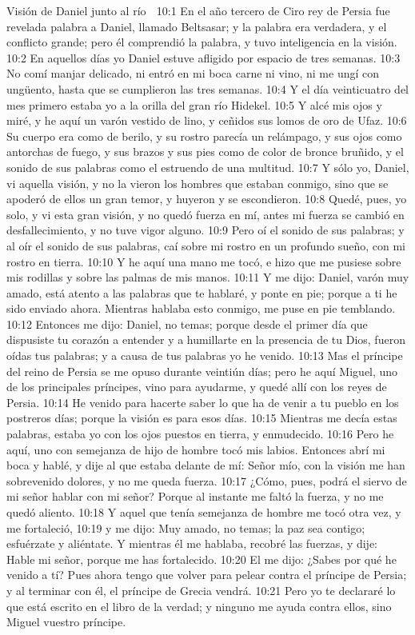 Visión de Daniel junto al río  

10:1 En el año tercero de Ciro rey de Persia fue revelada palabra a Daniel, llamado Beltsasar; y la palabra era verdadera, y el conflicto grande; pero él comprendió la palabra, y tuvo inteligencia en la visión.  
10:2 En aquellos días yo Daniel estuve afligido por espacio de tres semanas.  
10:3 No comí manjar delicado, ni entró en mi boca carne ni vino, ni me ungí con ungüento, hasta que se cumplieron las tres semanas.  
10:4 Y el día veinticuatro del mes primero estaba yo a la orilla del gran río Hidekel.  
10:5 Y alcé mis ojos y miré, y he aquí un varón vestido de lino, y ceñidos sus lomos de oro de Ufaz.  
10:6 Su cuerpo era como de berilo, y su rostro parecía un relámpago, y sus ojos como antorchas de fuego, y sus brazos y sus pies como de color de bronce bruñido, y el sonido de sus palabras como el estruendo de una multitud.  
10:7 Y sólo yo, Daniel, vi aquella visión, y no la vieron los hombres que estaban conmigo, sino que se apoderó de ellos un gran temor, y huyeron y se escondieron.  
10:8 Quedé, pues, yo solo, y vi esta gran visión, y no quedó fuerza en mí, antes mi fuerza se cambió en desfallecimiento, y no tuve vigor alguno.  
10:9 Pero oí el sonido de sus palabras; y al oír el sonido de sus palabras, caí sobre mi rostro en un profundo sueño, con mi rostro en tierra.  
10:10 Y he aquí una mano me tocó, e hizo que me pusiese sobre mis rodillas y sobre las palmas de mis manos.  
10:11 Y me dijo: Daniel, varón muy amado, está atento a las palabras que te hablaré, y ponte en pie; porque a ti he sido enviado ahora. Mientras hablaba esto conmigo, me puse en pie temblando.  
10:12 Entonces me dijo: Daniel, no temas; porque desde el primer día que dispusiste tu corazón a entender y a humillarte en la presencia de tu Dios, fueron oídas tus palabras; y a causa de tus palabras yo he venido.  
10:13 Mas el príncipe del reino de Persia se me opuso durante veintiún días; pero he aquí Miguel, uno de los principales príncipes, vino para ayudarme, y quedé allí con los reyes de Persia.  
10:14 He venido para hacerte saber lo que ha de venir a tu pueblo en los postreros días; porque la visión es para esos días.  
10:15 Mientras me decía estas palabras, estaba yo con los ojos puestos en tierra, y enmudecido.  
10:16 Pero he aquí, uno con semejanza de hijo de hombre tocó mis labios. Entonces abrí mi boca y hablé, y dije al que estaba delante de mí: Señor mío, con la visión me han sobrevenido dolores, y no me queda fuerza.  
10:17 ¿Cómo, pues, podrá el siervo de mi señor hablar con mi señor? Porque al instante me faltó la fuerza, y no me quedó aliento.  
10:18 Y aquel que tenía semejanza de hombre me tocó otra vez, y me fortaleció,  
10:19 y me dijo: Muy amado, no temas; la paz sea contigo; esfuérzate y aliéntate. Y mientras él me hablaba, recobré las fuerzas, y dije: Hable mi señor, porque me has fortalecido.  
10:20 El me dijo: ¿Sabes por qué he venido a tí? Pues ahora tengo que volver para pelear contra el príncipe de Persia; y al terminar con él, el príncipe de Grecia vendrá.  
10:21 Pero yo te declararé lo que está escrito en el libro de la verdad; y ninguno me ayuda contra ellos, sino Miguel vuestro príncipe.  

